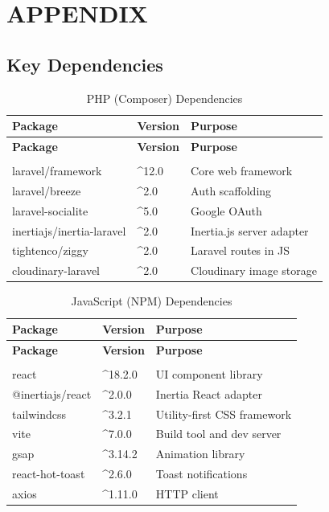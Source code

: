 \chapter{APPENDIX}

\section{Key Dependencies}
\renewcommand{\arraystretch}{1.3}
\begin{longtable}{|p{5cm}|p{3cm}|p{5cm}|}
    \hline
    \textbf{Package} & \textbf{Version} & \textbf{Purpose} \\
    \hline
    \endfirsthead
    \hline
    \textbf{Package} & \textbf{Version} & \textbf{Purpose} \\
    \hline
    \endhead
    \hline
    \endfoot
    \hline
    \caption{PHP (Composer) Dependencies} \label{tab:php_deps} \\
    \endlastfoot
    laravel/framework & \^{}12.0 & Core web framework \\
    \hline
    laravel/breeze & \^{}2.0 & Auth scaffolding \\
    \hline
    laravel-socialite & \^{}5.0 & Google OAuth \\
    \hline
    inertiajs/inertia-laravel & \^{}2.0 & Inertia.js server adapter \\
    \hline
    tightenco/ziggy & \^{}2.0 & Laravel routes in JS \\
    \hline
    cloudinary-laravel & \^{}2.0 & Cloudinary image storage \\
    \hline
\end{longtable}

\renewcommand{\arraystretch}{1.3}
\begin{longtable}{|p{5cm}|p{3cm}|p{5cm}|}
    \hline
    \textbf{Package} & \textbf{Version} & \textbf{Purpose} \\
    \hline
    \endfirsthead
    \hline
    \textbf{Package} & \textbf{Version} & \textbf{Purpose} \\
    \hline
    \endhead
    \hline
    \endfoot
    \hline
    \caption{JavaScript (NPM) Dependencies} \label{tab:js_deps} \\
    \endlastfoot
    react & \^{}18.2.0 & UI component library \\
    \hline
    @inertiajs/react & \^{}2.0.0 & Inertia React adapter \\
    \hline
    tailwindcss & \^{}3.2.1 & Utility-first CSS framework \\
    \hline
    vite & \^{}7.0.0 & Build tool and dev server \\
    \hline
    gsap & \^{}3.14.2 & Animation library \\
    \hline
    react-hot-toast & \^{}2.6.0 & Toast notifications \\
    \hline
    axios & \^{}1.11.0 & HTTP client \\
    \hline
\end{longtable}

